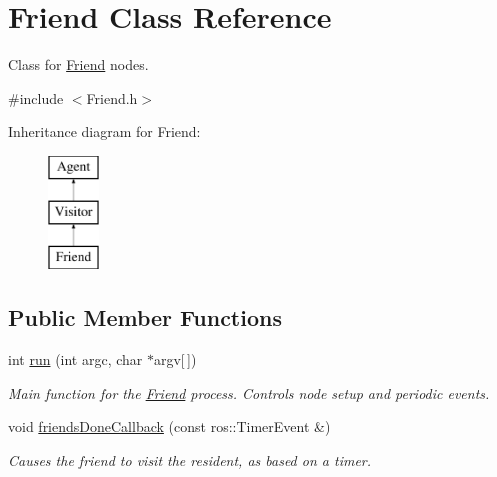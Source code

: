 \hypertarget{classFriend}{\section{Friend Class Reference}
\label{classFriend}
}


Class for \hyperlink{classFriend}{Friend} nodes.  




{\ttfamily \#include $<$Friend.\-h$>$}

Inheritance diagram for Friend\-:\begin{figure}[H]
\begin{center}
\leavevmode
\includegraphics[height=3.000000cm]{classFriend}
\end{center}
\end{figure}
\subsection*{Public Member Functions}
\begin{DoxyCompactItemize}
\item 
\hypertarget{classFriend_a0a4bf249b808ade72706f8f0a639ccde}{int \hyperlink{classFriend_a0a4bf249b808ade72706f8f0a639ccde}{run} (int argc, char $\ast$argv\mbox{[}$\,$\mbox{]})}\label{classFriend_a0a4bf249b808ade72706f8f0a639ccde}

\begin{DoxyCompactList}\small\item\em Main function for the \hyperlink{classFriend}{Friend} process. Controls node setup and periodic events. \end{DoxyCompactList}\item 
void \hyperlink{classFriend_a1cee00d4939701c7f3d53bea1cb9e8ae}{friends\-Done\-Callback} (const ros\-::\-Timer\-Event \&)
\begin{DoxyCompactList}\small\item\em Causes the friend to visit the resident, as based on a timer. \end{DoxyCompactList}\end{DoxyCompactItemize}
